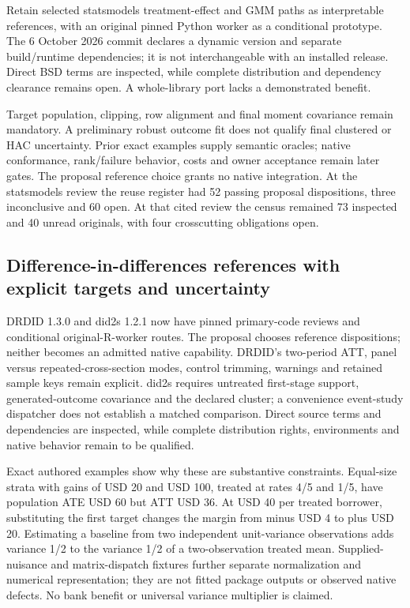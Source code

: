 Retain selected statsmodels treatment-effect and GMM paths as
interpretable references, with an original pinned Python worker as a
conditional prototype. The 6 October 2026 commit declares a dynamic
version and separate build/runtime dependencies; it is not
interchangeable with an installed release. Direct BSD terms are
inspected, while complete distribution and dependency clearance remains
open. A whole-library port lacks a demonstrated benefit.
\citep{exec20_python_effect_source,exec24_statsmodels_distribution}

Target population, clipping, row alignment and final moment covariance
remain mandatory. A preliminary robust outcome fit does not qualify
final clustered or HAC uncertainty. Prior exact examples supply semantic
oracles; native conformance, rank/failure behavior, costs and owner
acceptance remain later gates. The proposal reference choice grants no
native integration.
\citep{exec20_python_effect_reference,exec24_statsmodels_distribution}
At the statsmodels review the reuse register had 52 passing proposal
dispositions, three inconclusive and 60 open. At that cited review the
census remained 73 inspected and 40 unread originals, with four
crosscutting obligations open.
\citep{sp24statsmodels_reader,sp24statsmodels_progress}

\hypertarget{difference-in-differences-references-with-explicit-targets-and-uncertainty}{%
\subsection{Difference-in-differences references with explicit targets
and
uncertainty}\label{difference-in-differences-references-with-explicit-targets-and-uncertainty}}

DRDID 1.3.0 and did2s 1.2.1 now have pinned primary-code reviews and
conditional original-R-worker routes. The proposal chooses reference
dispositions; neither becomes an admitted native capability. DRDID's
two-period ATT, panel versus repeated-cross-section modes, control
trimming, warnings and retained sample keys remain explicit. did2s
requires untreated first-stage support, generated-outcome covariance and
the declared cluster; a convenience event-study dispatcher does not
establish a matched comparison. Direct source terms and dependencies are
inspected, while complete distribution rights, environments and native
behavior remain to be qualified.
\citep{exec24_drdid_reuse_source,exec24_did2s_reuse_source}

Exact authored examples show why these are substantive constraints.
Equal-size strata with gains of USD 20 and USD 100, treated at rates 4/5
and 1/5, have population ATE USD 60 but ATT USD 36. At USD 40 per
treated borrower, substituting the first target changes the margin from
minus USD 4 to plus USD 20. Estimating a baseline from two independent
unit-variance observations adds variance 1/2 to the variance 1/2 of a
two-observation treated mean. Supplied-nuisance and matrix-dispatch
fixtures further separate normalization and numerical representation;
they are not fitted package outputs or observed native defects. No bank
benefit or universal variance multiplier is claimed.
\citep{exec24_panel_reuse_reference}

